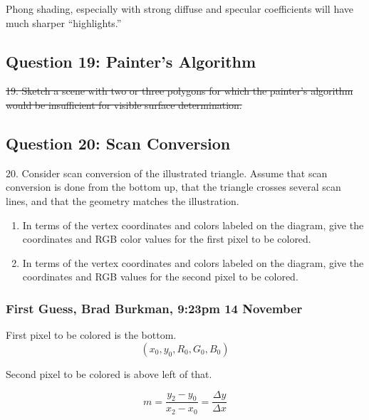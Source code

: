 \documentclass[11pt]{article}
\begin{document}
\begin{spacing}{1.2}
Phong shading, especially with strong diffuse and specular coefficients will have much sharper ``highlights.''  

\subsection{Question 19:  Painter's Algorithm}
\sout{19.  Sketch a scene with two or three polygons for which the painter's algorithm would be insufficient for visible surface determination.  }

\subsection{Question 20:  Scan Conversion}
20.  Consider scan conversion of the illustrated triangle.  Assume that scan conversion is done from the bottom up, that the triangle crosses several scan lines, and that the geometry matches the illustration.  


\begin{enumerate}[label=\arabic*)]
	\item In terms of the vertex coordinates and colors labeled on the diagram, give the coordinates and RGB color values for the first pixel to be colored.  
	\item In terms of the vertex coordinates and colors labeled on the diagram, give the coordinates and RGB values for the second pixel to be colored.  
\end{enumerate}

\subsubsection{First Guess, Brad Burkman, 9:23pm 14 November}

First pixel to be colored is the bottom.  
$$(x_0, y_0, R_0, G_0, B_0)$$

Second pixel to be colored is above left of that.  

$$m = \frac{y_2 - y_0}{x_2 - x_0} = \frac{\Delta y}{\Delta x}$$


\end{spacing}
\end{document}
